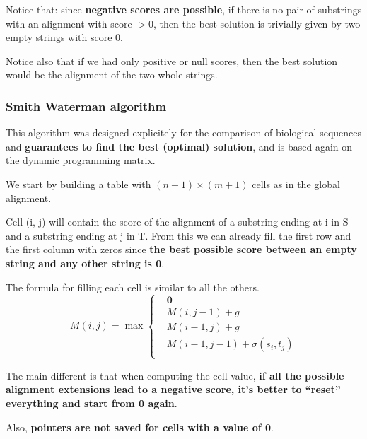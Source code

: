 \documentclass[../main.tex]{subfiles}
\begin{document}
Notice that: since \textbf{negative scores are possible}, if there is no pair of substrings with an alignment with score $> 0$, then the best solution is trivially given by two empty strings with score 0.

Notice also that if we had only positive or null scores, then the best solution would be the alignment of the two whole strings.

\subsubsection{Smith Waterman algorithm}

This algorithm was designed explicitely for the comparison of biological sequences and \textbf{guarantees to find the best (optimal) solution}, and is based again on the dynamic programming matrix.

We start by building a table with $(n+1)\times(m+1)$ cells as in the global alignment.

Cell (i, j) will contain the score of the alignment of a substring ending at i in S and a substring ending at j in T. From this we can already fill the first row and the first column with zeros since \textbf{the best possible score between an empty string and any other string is 0}.

The formula for filling each cell is similar to all the others.
$$
M(i, j) = \max \left\{\begin{array}{rcl}
&\mathbf{0} \\
&M(i, j-1) + g \\ 
&M(i-1, j) + g \\
&M(i-1, j-1) + \sigma(s_i, t_j) \\
\end{array}
\right.
$$

The main different is that when computing the cell value, \textbf{if all the possible alignment extensions lead to a negative score, it's better to ``reset'' everything and start from 0 again}.

Also, \textbf{pointers are not saved for cells with a value of 0}.
\end{document}
